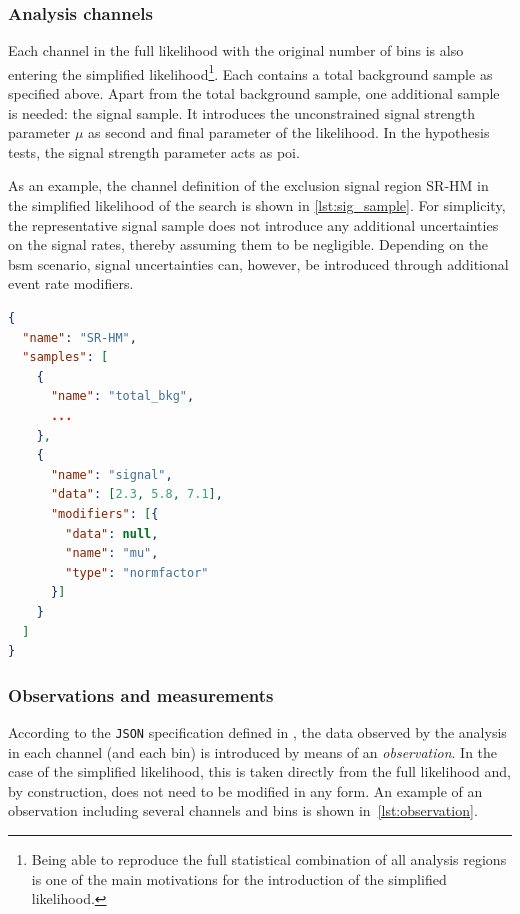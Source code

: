 \subsubsection{Analysis channels}

Each channel in the full likelihood with the original number of bins is also entering the simplified likelihood\footnote{Being able to reproduce the full statistical combination of all analysis regions is one of the main motivations for the introduction of the simplified likelihood.}.
Each contains a total background sample as specified above.
Apart from the total background sample, one additional sample is needed: the signal sample.
It introduces the unconstrained signal strength parameter $\mu$ as second and final parameter of the likelihood. In the hypothesis tests, the signal strength parameter acts as \gls{poi}.

As an example, the channel definition of the exclusion signal region SR-HM in the simplified likelihood of the \onelepton search is shown in \cref{lst:sig_sample}. For simplicity, the representative signal sample does not introduce any additional uncertainties on the signal rates, thereby assuming them to be negligible. Depending on the \gls{bsm} scenario, signal uncertainties can, however, be introduced through additional event rate modifiers.

\begin{minipage}{\linewidth}
\begin{lstlisting}[language=json,firstnumber=1,caption={Channel definition of the exclusion signal region SR-HM of the \onelepton search. The representative signal sample with sample rate and unconstrained normalisation parameter does not introduce any additional uncertainties. The three dots `\dots' contain the remaining definition for the total background sample from \cref{lst:bkg_sample}.},captionpos=b, label=lst:sig_sample]
{
  "name": "SR-HM",
  "samples": [
    {
      "name": "total_bkg",
      ...
    },
    {
      "name": "signal",
      "data": [2.3, 5.8, 7.1],
      "modifiers": [{
        "data": null, 
        "name": "mu", 
        "type": "normfactor"
      }]
    }
  ]
}
\end{lstlisting}
\end{minipage}

\subsubsection{Observations and measurements}

According to the \texttt{JSON} specification defined in \cite{ATL-PHYS-PUB-2019-029}, the data observed by the analysis in each channel (and each bin) is introduced by means of an \textit{observation}. In the case of the simplified likelihood, this is taken directly from the full likelihood and, by construction, does not need to be modified in any form. An example of an observation including several channels and bins is shown in~\cref{lst:observation}.

